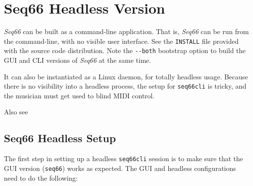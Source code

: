 %
%
%

\section{Seq66 Headless Version}
\label{sec:headless}

   \textsl{Seq66} can be built as a command-line application.
   That is, \textsl{Seq66}
   can be run from the command-line, with no visible user interface.
   See the \texttt{INSTALL} file provided with the source code distribution.
   Note the \texttt{-{}-both} bootstrap option to build the GUI and CLI
   versions of \textsl{Seq66} at the same time.

   It can also be instantiated as a Linux daemon, for totally headless usage.
   Because there is no visibility into a headless process, the
   setup for \texttt{seq66cli} is tricky, and the musician must get
   used to blind MIDI control.

   Also see 

\subsection{Seq66 Headless Setup}
\label{subsec:headless_setup}

   The first step in setting up a headless \texttt{seq66cli} session is
   to make sure that the GUI version (\texttt{seq66}) works as expected.
   The GUI and headless configurations need to do the following:
   
